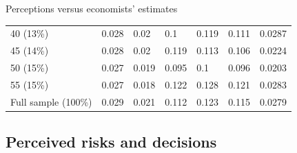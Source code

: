 \documentclass{beamer}
\begin{document}
\begin{frame}{Perceptions versus economists' estimates}
\begin{table}
{\begin{tabular}{lllllll}
			40 (13\%)              & 0.028      & 0.02       & 0.1                & 0.119        & 0.111 & 0.0287 \\
			45 (14\%)              & 0.028      & 0.02       & 0.119              & 0.113        & 0.106 & 0.0224 \\
			50 (15\%)              & 0.027      & 0.019      & 0.095              & 0.1          & 0.096 & 0.0203 \\
			55 (15\%)              & 0.027      & 0.018      & 0.122              & 0.128        & 0.121 & 0.0283 \\
			\hline 
			Full sample (100\%)          & 0.029      & 0.021      & 0.112              & 0.123        & 0.115 & 0.0279 \\
			\hline \hline 
		\end{tabular}
		}
	\end{table}
\end{frame}




\subsection{Perceived risks and decisions}
\end{document}
